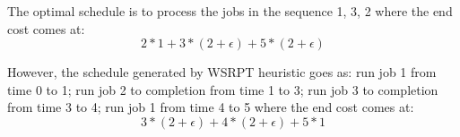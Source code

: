 \documentclass[12pt]{article}
\begin{document}
\begin{enumerate}
The optimal schedule is to process the jobs in the sequence 1, 3, 2 where the end cost comes at:
\begin{equation}
2*1 + 3 * (2 + \epsilon) + 5 * (2 + \epsilon)
\end{equation}

However, the schedule generated by WSRPT heuristic goes as: run job 1 from time 0 to 1; run job 2 to completion from time 1 to 3; run job 3 to completion from time 3 to 4; run job 1 from time 4 to 5 where the end cost comes at:
\begin{equation}
3 * (2 + \epsilon) + 4 * (2 + \epsilon) + 5 * 1
\end{equation}

\end{enumerate}
\end{document}

